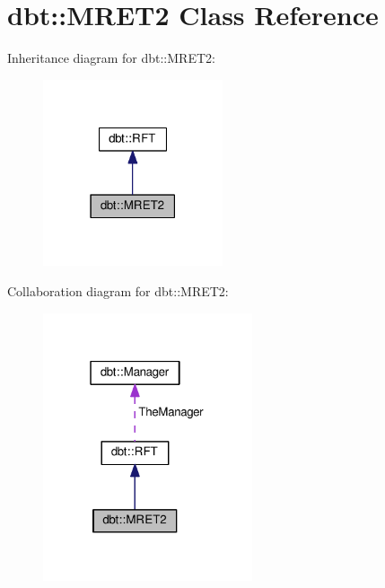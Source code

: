 \hypertarget{classdbt_1_1_m_r_e_t2}{}\section{dbt\+:\+:M\+R\+E\+T2 Class Reference}
\label{classdbt_1_1_m_r_e_t2}


Inheritance diagram for dbt\+:\+:M\+R\+E\+T2\+:\nopagebreak
\begin{figure}[H]
\begin{center}
\leavevmode
\includegraphics[width=150pt]{classdbt_1_1_m_r_e_t2__inherit__graph}
\end{center}
\end{figure}


Collaboration diagram for dbt\+:\+:M\+R\+E\+T2\+:\nopagebreak
\begin{figure}[H]
\begin{center}
\leavevmode
\includegraphics[width=175pt]{classdbt_1_1_m_r_e_t2__coll__graph}
\end{center}
\end{figure}
